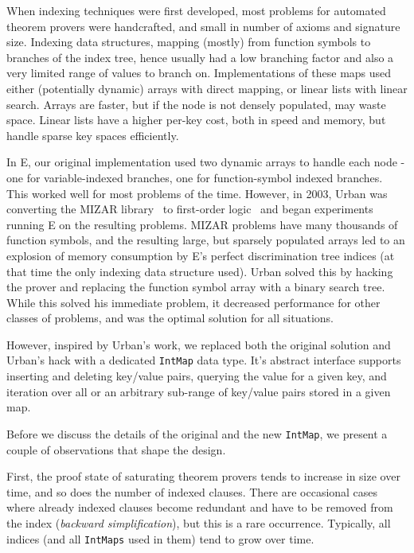 \documentclass[]{ceurart}
\begin{document}
When indexing techniques were first developed, most problems for
automated theorem provers were handcrafted, and small in number of
axioms and signature size. Indexing data structures, mapping (mostly)
from function symbols to branches of the index tree, hence usually had
a low branching factor and also a very limited range of values to
branch on. Implementations of these maps used either (potentially
dynamic) arrays with direct mapping, or linear lists with linear
search. Arrays are faster, but if the node is not densely populated,
may waste space. Linear lists have a higher per-key cost, both in
speed and memory, but handle sparse key spaces efficiently.

In E, our original implementation used two dynamic arrays to handle
each node - one for variable-indexed branches, one for function-symbol
indexed branches. This worked well for most problems of the
time. However, in 2003, Urban was converting the MIZAR
library~\cite{TB:IJCAI-1985} to first-order
logic~\cite{Urban:MKM-2003,Urban:JAR-2004} and began experiments
running E on the resulting problems. MIZAR problems have many
thousands of function symbols, and the resulting large, but sparsely
populated arrays led to an explosion of memory consumption by E's
perfect discrimination tree indices (at that time the only indexing
data structure used). Urban solved this by hacking the prover and
replacing the function symbol array with a binary search tree. While
this solved his immediate problem, it decreased performance for other
classes of problems, and was the optimal solution for all situations.

However, inspired by Urban's work, we replaced both the original
solution and Urban's hack with a dedicated \texttt{IntMap} data
type. It's abstract interface supports inserting and deleting
key/value pairs, querying the value for a given key, and iteration over
all or an arbitrary sub-range of key/value pairs stored in a given map.

Before we discuss the details of the original and the new
\texttt{IntMap}, we present a couple of observations that shape the
design.

First, the proof state of saturating theorem provers tends to increase
in size over time, and so does the number of indexed clauses. There
are occasional cases where already indexed clauses become redundant
and have to be removed from the index (\emph{backward
  simplification}), but this is a rare occurrence. Typically, all
indices (and all \texttt{IntMaps} used in them) tend to grow over
time.
\end{document}

